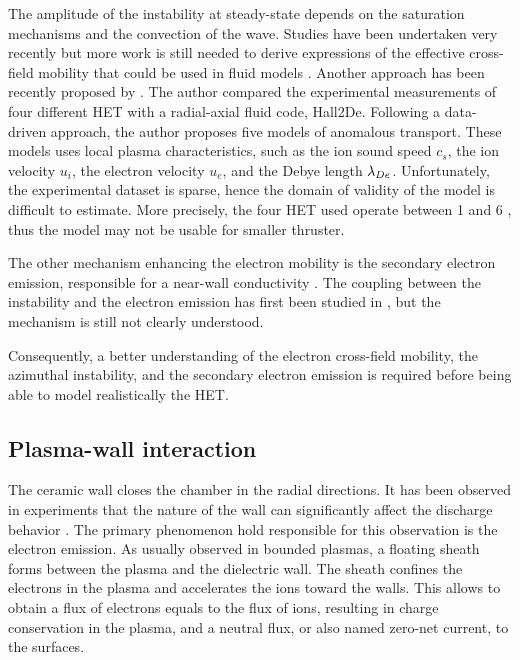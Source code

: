   The amplitude of the instability at steady-state depends on the saturation mechanisms and the convection of the wave.
  Studies have been  undertaken very recently but more work is still needed to derive expressions of the effective cross-field mobility that could be used in fluid models \citep{boeuf2017}.
  Another approach has been recently proposed by \citet{jorns2018}.
  The author compared the experimental measurements of four different \ac{HET} with a radial-axial fluid code, Hall2De.
  Following a data-driven approach, the author proposes five models of anomalous transport.
  These models uses local plasma characteristics, such as the ion sound speed $c_s$, the ion velocity $u_i$, the electron velocity $u_e$, and the Debye length $\lambda_{De}$.
  Unfortunately, the experimental dataset is sparse, hence the domain of validity of the model is difficult to estimate.
  More precisely, the four \ac{HET} used operate between 1 and 6 \kilo\watt, thus the model may not be usable for smaller thruster.
  
  \vspace{1em}
  The other mechanism enhancing the electron mobility is the secondary electron emission, responsible for a near-wall conductivity \citep{morozov1972,morozov2001, barral2003a}.
  The coupling between the instability and the electron emission has first been studied in \citet{heron2013}, but the mechanism is still not clearly understood.
  
  Consequently, a better understanding of the electron cross-field mobility, the azimuthal instability, and the secondary electron emission is required before being able to model realistically the \ac{HET}.
  
  
\subsection*{Plasma-wall interaction}

  The ceramic wall closes the chamber in the radial directions.
  It has been observed in experiments that the nature of the wall can significantly affect the discharge behavior \citep{gascon2003}.
  The primary phenomenon hold responsible for this observation is the electron emission.
  As usually observed in bounded plasmas, a floating sheath forms between the plasma and the dielectric wall.
  The sheath confines the electrons in the plasma and accelerates the ions toward the walls.
  This allows to obtain a flux of electrons equals to the flux of ions, resulting in charge conservation in the plasma, and a neutral flux, or also named zero-net current, to the surfaces.
  
